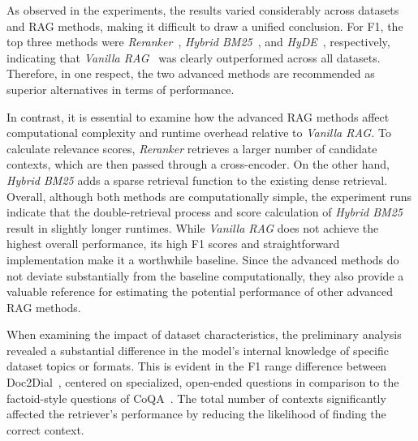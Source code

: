 \documentclass[11pt]{article}
\begin{document}


As observed in the experiments, the results varied considerably across datasets and RAG methods, making it difficult to draw a unified conclusion. For F1, the top three methods were \textit{Reranker}~\cite{glass-etal-2022-re2g}, \textit{Hybrid BM25}~\cite{gao_complement_2021}, and \textit{HyDE}~\cite{gao_precise_2023}, respectively, indicating that \textit{Vanilla RAG}~\cite{lewis_retrievalaugmented_2020} was clearly outperformed across all datasets. Therefore, in one respect, the two advanced methods are recommended as superior alternatives in terms of performance. 
    
In contrast, it is essential to examine how the advanced RAG methods affect computational complexity and runtime overhead relative to \textit{Vanilla RAG.} To calculate relevance scores, \textit{Reranker} retrieves a larger number of candidate contexts, which are then passed through a cross-encoder. On the other hand, \textit{Hybrid BM25} adds a sparse retrieval function to the existing dense retrieval. Overall, although both methods are computationally simple, the experiment runs indicate that the double-retrieval process and score calculation of \textit{Hybrid BM25} result in slightly longer runtimes. 
While \textit{Vanilla RAG} does not achieve the highest overall performance, its high F1 scores and straightforward implementation make it a worthwhile baseline. Since the advanced methods do not deviate substantially from the baseline computationally, they also provide a valuable reference for estimating the potential performance of other advanced RAG methods. 

When examining the impact of dataset characteristics, the preliminary analysis revealed a substantial difference in the model's internal knowledge of specific dataset topics or formats. This is evident in the F1 range difference between Doc2Dial~\cite{feng_doc2dial_2020}, centered on specialized, open-ended questions in comparison to the factoid-style questions of CoQA~\cite{reddy_coqa_2019}. The total number of contexts significantly affected the retriever's performance by reducing the likelihood of finding the correct context.
\end{document}
